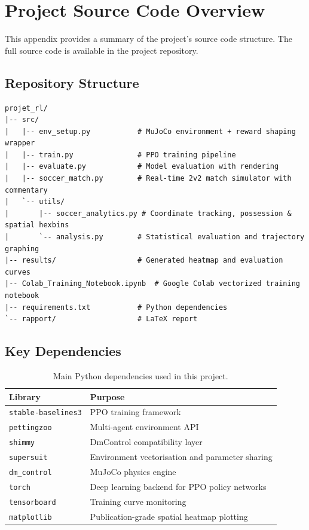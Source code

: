 \chapter{Project Source Code Overview}
\label{appn:A}

This appendix provides a summary of the project's source code structure. The full source code is available in the project repository.

\section*{Repository Structure}

\begin{verbatim}
projet_rl/
|-- src/
|   |-- env_setup.py           # MuJoCo environment + reward shaping wrapper
|   |-- train.py               # PPO training pipeline
|   |-- evaluate.py            # Model evaluation with rendering
|   |-- soccer_match.py        # Real-time 2v2 match simulator with commentary
|   `-- utils/
|       |-- soccer_analytics.py # Coordinate tracking, possession & spatial hexbins
|       `-- analysis.py        # Statistical evaluation and trajectory graphing
|-- results/                   # Generated heatmap and evaluation curves
|-- Colab_Training_Notebook.ipynb  # Google Colab vectorized training notebook
|-- requirements.txt           # Python dependencies
`-- rapport/                   # LaTeX report
\end{verbatim}

\section*{Key Dependencies}

\begin{table}[h!]
    \centering
    \caption{Main Python dependencies used in this project.}
    \begin{tabular}{ll}
        \toprule
        \textbf{Library} & \textbf{Purpose} \\
        \midrule
        \texttt{stable-baselines3} & PPO training framework \\
        \texttt{pettingzoo}        & Multi-agent environment API \\
        \texttt{shimmy}            & DmControl compatibility layer \\
        \texttt{supersuit}         & Environment vectorisation and parameter sharing \\
        \texttt{dm\_control}       & MuJoCo physics engine \\
        \texttt{torch}             & Deep learning backend for PPO policy networks \\
        \texttt{tensorboard}       & Training curve monitoring \\
        \texttt{matplotlib}        & Publication-grade spatial heatmap plotting \\
        \bottomrule
    \end{tabular}
\end{table}

